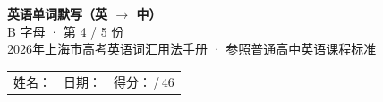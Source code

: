 \documentclass[10pt,a4paper]{article}
\begin{document}
\pagestyle{plain}

\begin{center}
{\LARGE\bfseries 英语单词默写（英 $\to$ 中）}\\[0.22em]
{\large B 字母 · 第 4 / 5 份}\\[0.18em]
{\small 2026年上海市高考英语词汇用法手册 · 参照普通高中英语课程标准}
\end{center}

\vspace{0.25em}
\noindent\begin{tabular}{@{}p{}@{}p{}@{}p{}@{}}
姓名：\underline{\hspace{2.0cm}} & 日期：\underline{\hspace{2.0cm}} & 得分：\underline{\hspace{1.3cm}}\,/\,46 \\
\end{tabular}

\vspace{0.3em}

\vspace{0.08em}
\end{document}
